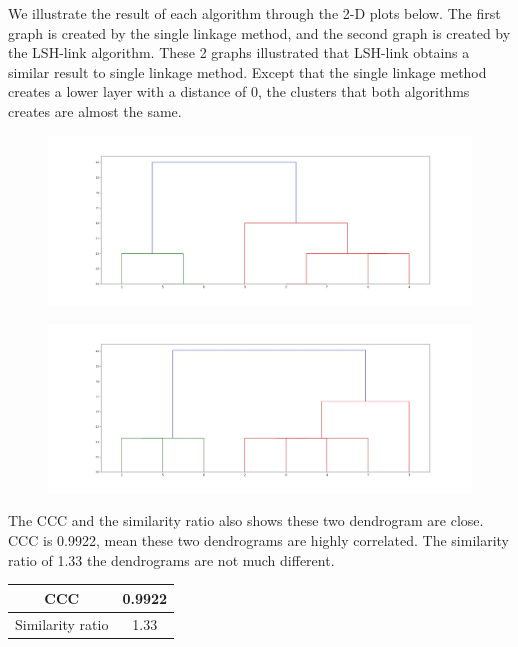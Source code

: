 \documentclass{report}
\begin{document}
We illustrate the result of each algorithm through the 2-D plots below. The first graph is created by the single linkage method, and the second graph is created by the LSH-link algorithm. These 2 graphs illustrated that LSH-link obtains a similar result to single linkage method. Except that the single linkage method creates a lower layer with a distance of 0, the clusters that both algorithms creates are almost the same.

\begin{figure}[H]
	\centering
	\includegraphics[width=1.0\textwidth]{figures/sim_single.jpg}
\end{figure}

\begin{figure}[H]
	\centering
	\includegraphics[width=1.0\textwidth]{figures/sim_lsh.jpg}
\end{figure}
The CCC and the similarity ratio also shows these two dendrogram are close. CCC is 0.9922, mean these two dendrograms are highly correlated. The similarity ratio of 1.33 the dendrograms are not much different.
\begin{table}[H]
\centering
\begin{tabular}{cc}
\hline
CCC & 0.9922 \\ \hline
Similarity ratio & 1.33 \\ \hline
\end{tabular}
\end{table}
\end{document}
